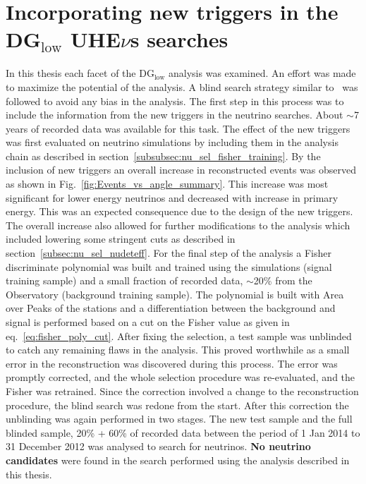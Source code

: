\section*{Incorporating new triggers in the DG$\mathrm{_{low}}$ UHE$\nu$s searches}
In this thesis each facet of the DG$_{\text{low}}$ analysis was examined. An effort was made to maximize the potential of the analysis. A blind search strategy similar to~\cite{gap_note_2013,Aab_2019_diffuse} was followed to avoid any bias in the analysis. The first step in this process was to include the information from the new triggers in the neutrino searches. About $\sim$7 years of recorded data was available for this task. The effect of the new triggers was first evaluated on neutrino simulations by including them in the analysis chain as described in section~\ref{subsubsec:nu_sel_fisher_training}. By the inclusion of new triggers an overall increase in reconstructed events was observed as shown in Fig.~\ref{fig:Events_vs_angle_summary}. This increase was most significant for lower energy neutrinos and decreased with increase in primary energy. This was an expected consequence due to the design of the new triggers. The overall increase also allowed for further modifications to the analysis which included lowering some stringent cuts as described in section~\ref{subsec:nu_sel_nudeteff}. For the final step of the analysis a Fisher discriminate polynomial was built and trained using the simulations (signal training sample) and a small fraction of recorded data, $\sim$20\% from the Observatory (background training sample). The polynomial is built with Area over Peaks of the stations and a differentiation between the background and signal is performed based on a cut on the Fisher value as given in eq.~\ref{eq:fisher_poly_cut}.
After fixing the selection, a test sample was unblinded to catch any remaining flaws in the analysis. This proved worthwhile as a small error in the reconstruction was discovered during this process. The error was promptly corrected, and the whole selection procedure was re-evaluated, and the Fisher was retrained. Since the correction involved a change to the reconstruction procedure, the blind search was redone from the start. After this correction the unblinding was again performed in two stages. The new test sample and the full blinded sample, 20\% + 60\% of recorded data between the period of 1 Jan 2014 to 31 December 2012 was analysed to search for neutrinos. \textbf{No neutrino candidates} were found in the search performed using the analysis described in this thesis. 

